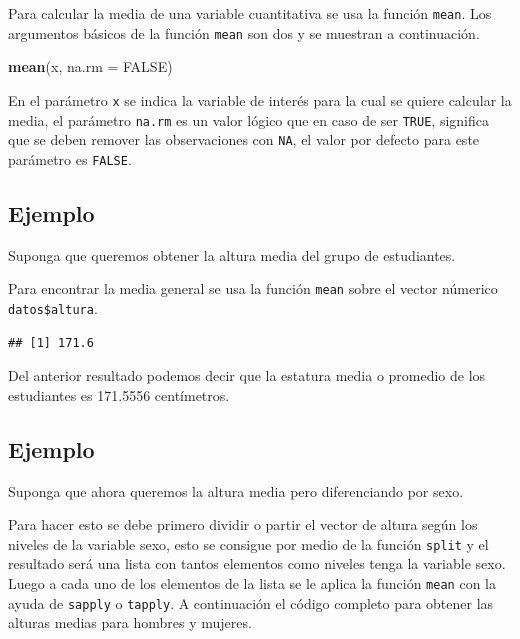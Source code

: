 \documentclass[10pt,]{krantz}
\makeatletter
\newenvironment{Shaded}{\begin{snugshade}}{\end{snugshade}}
\newcommand{\KeywordTok}[1]{\textcolor[rgb]{0.13,0.29,0.53}{\textbf{{#1}}}}
\newcommand{\DataTypeTok}[1]{\textcolor[rgb]{0.13,0.29,0.53}{{#1}}}
\newcommand{\OtherTok}[1]{\textcolor[rgb]{0.56,0.35,0.01}{{#1}}}
\newcommand{\NormalTok}[1]{{#1}}
\newenvironment{kframe}{%
\medskip{}
\setlength{\fboxsep}{.8em}
 \def\at@end@of@kframe{}%
 \ifinner\ifhmode%
  \def\at@end@of@kframe{\end{minipage}}%
  \begin{minipage}{\columnwidth}%
 \fi\fi%
 \def\FrameCommand##1{\hskip\@totalleftmargin \hskip-\fboxsep
 \colorbox{shadecolor}{##1}\hskip-\fboxsep
     \hskip-\linewidth \hskip-\@totalleftmargin \hskip\columnwidth}%
 \MakeFramed {\advance\hsize-\width
   \@totalleftmargin\z@ \linewidth\hsize
   \@setminipage}}%
 {\par\unskip\endMakeFramed%
 \at@end@of@kframe}
\renewenvironment{Shaded}{\begin{kframe}}{\end{kframe}}
\makeatother
\begin{document}
Para calcular la media de una variable cuantitativa se usa la función
\texttt{mean}. Los argumentos básicos de la función \texttt{mean} son
dos y se muestran a continuación.

\begin{Shaded}
\begin{Highlighting}[]
\KeywordTok{mean}\NormalTok{(x, }\DataTypeTok{na.rm =} \OtherTok{FALSE}\NormalTok{)}
\end{Highlighting}
\end{Shaded}

En el parámetro \texttt{x} se indica la variable de interés para la cual
se quiere calcular la media, el parámetro \texttt{na.rm} es un valor
lógico que en caso de ser \texttt{TRUE}, significa que se deben remover
las observaciones con \texttt{NA}, el valor por defecto para este
parámetro es \texttt{FALSE}.

\subsection*{Ejemplo}\label{ejemplo}


Suponga que queremos obtener la altura media del grupo de estudiantes.

Para encontrar la media general se usa la función \texttt{mean} sobre el
vector númerico \texttt{datos\$altura}.

\begin{Shaded}
\end{Shaded}

\begin{verbatim}
## [1] 171.6
\end{verbatim}

Del anterior resultado podemos decir que la estatura media o promedio de
los estudiantes es 171.5556 centímetros.

\subsection*{Ejemplo}\label{ejemplo-1}


Suponga que ahora queremos la altura media pero diferenciando por sexo.

Para hacer esto se debe primero dividir o partir el vector de altura
según los niveles de la variable sexo, esto se consigue por medio de la
función \texttt{split} y el resultado será una lista con tantos
elementos como niveles tenga la variable sexo. Luego a cada uno de los
elementos de la lista se le aplica la función \texttt{mean} con la ayuda
de \texttt{sapply} o \texttt{tapply}. A continuación el código completo
para obtener las alturas medias para hombres y mujeres.
\end{document}
